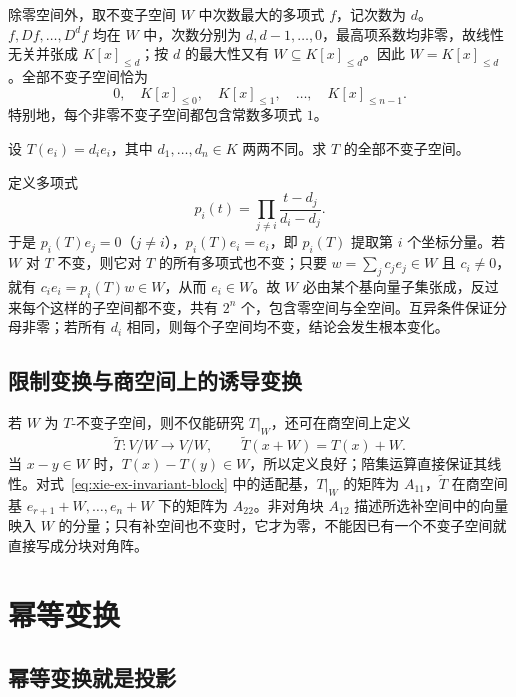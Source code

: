 \begin{solve}
除零空间外，取不变子空间 $W$ 中次数最大的多项式 $f$，记次数为 $d$。$f,Df,\ldots,D^df$ 均在 $W$ 中，次数分别为 $d,d-1,\ldots,0$，最高项系数均非零，故线性无关并张成 $K[x]_{\leq d}$；按 $d$ 的最大性又有 $W\subseteq K[x]_{\leq d}$。因此 $W=K[x]_{\leq d}$。全部不变子空间恰为
\[
    0,\quad K[x]_{\leq0},\quad K[x]_{\leq1},\quad\ldots,
    \quad K[x]_{\leq n-1}.
\]
特别地，每个非零不变子空间都包含常数多项式 $1$。
\end{solve}

\begin{example}
\label{ex:xie-ex-distinct-diagonal-invariant}
设 $T(e_i)=d_ie_i$，其中 $d_1,\ldots,d_n\in K$ 两两不同。求 $T$ 的全部不变子空间。
\end{example}

\begin{solve}
定义多项式
\[
    p_i(t)=\prod_{j\ne i}\frac{t-d_j}{d_i-d_j}.
\]
于是 $p_i(T)e_j=0$（$j\ne i$），$p_i(T)e_i=e_i$，即 $p_i(T)$ 提取第 $i$ 个坐标分量。若 $W$ 对 $T$ 不变，则它对 $T$ 的所有多项式也不变；只要 $w=\sum_jc_je_j\in W$ 且 $c_i\ne0$，就有 $c_ie_i=p_i(T)w\in W$，从而 $e_i\in W$。故 $W$ 必由某个基向量子集张成，反过来每个这样的子空间都不变，共有 $2^n$ 个，包含零空间与全空间。互异条件保证分母非零；若所有 $d_i$ 相同，则每个子空间均不变，结论会发生根本变化。
\end{solve}

\subsection{限制变换与商空间上的诱导变换}

若 $W$ 为 $T$-不变子空间，则不仅能研究 $T|_W$，还可在商空间上定义
\[
    \widetilde T:V/W\to V/W,\qquad
    \widetilde T(x+W)=T(x)+W.
\]
当 $x-y\in W$ 时，$T(x)-T(y)\in W$，所以定义良好；陪集运算直接保证其线性。对式~\eqref{eq:xie-ex-invariant-block} 中的适配基，$T|_W$ 的矩阵为 $A_{11}$，$\widetilde T$ 在商空间基 $e_{r+1}+W,\ldots,e_n+W$ 下的矩阵为 $A_{22}$。非对角块 $A_{12}$ 描述所选补空间中的向量映入 $W$ 的分量；只有补空间也不变时，它才为零，不能因已有一个不变子空间就直接写成分块对角阵。

\section{幂等变换}
\label{sec:xie-ex-idempotents}

\subsection{幂等变换就是投影}


